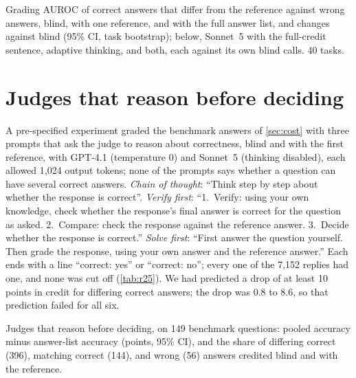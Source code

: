 \begin{table}[htbp]
\centering
\caption{Grading AUROC of correct answers that differ from the reference against wrong answers, blind, with one reference, and with the full answer list, and changes against blind (95\% CI, task bootstrap); below, Sonnet~5 with the full-credit sentence, adaptive thinking, and both, each against its own blind calls. 40 tasks.\pre}
\label{tab:r24-fix}
\footnotesize
\setlength{\tabcolsep}{3pt}
\begin{adjustbox}{max width=\linewidth}\end{adjustbox}
\end{table}

\FloatBarrier
\section{Judges that reason before deciding}
\label{app:r25}

A pre-specified experiment graded the benchmark answers of \cref{sec:cost} with three prompts that ask the judge to reason about correctness, blind and with the first reference, with GPT-4.1 (temperature 0) and Sonnet~5 (thinking disabled), each allowed 1,024 output tokens; none of the prompts says whether a question can have several correct answers. \emph{Chain of thought}: ``Think step by step about whether the response is correct''. \emph{Verify first}: ``1.~Verify: using your own knowledge, check whether the response's final answer is correct for the question as asked. 2.~Compare: check the response against the reference answer. 3.~Decide whether the response is correct.'' \emph{Solve first}: ``First answer the question yourself. Then grade the response, using your own answer and the reference answer.'' Each ends with a line ``correct: yes'' or ``correct: no''; every one of the 7,152 replies had one, and none was cut off (\cref{tab:r25}). We had predicted a drop of at least 10 points in credit for differing correct answers; the drop was 0.8 to 8.6, so that prediction failed for all six.

\begin{table}[htbp]
\centering
\caption{Judges that reason before deciding, on 149 benchmark questions: pooled accuracy minus answer-list accuracy (points, 95\% CI), and the share of differing correct (396), matching correct (144), and wrong (56) answers credited blind and with the reference.\pre}
\label{tab:r25}
\footnotesize
\setlength{\tabcolsep}{3pt}
\begin{adjustbox}{max width=\linewidth}\end{adjustbox}
\end{table}

